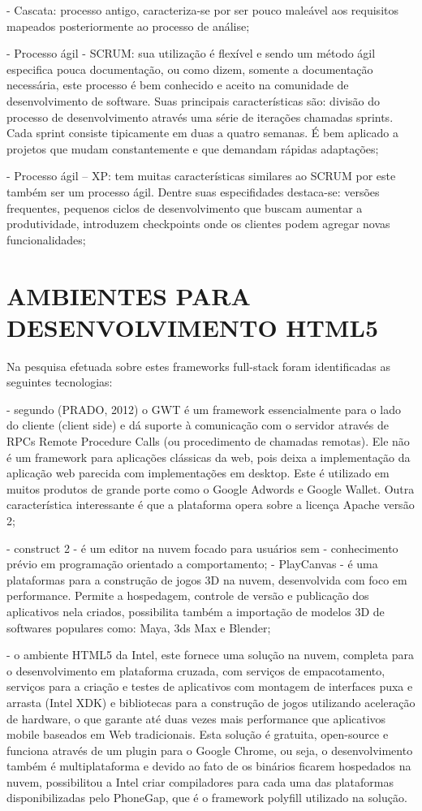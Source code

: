 \documentclass[
12pt,
a4paper,
portuges,
draft
]{report}
\begin{document}
- Cascata: processo antigo, caracteriza-se por ser pouco maleável aos
requisitos mapeados posteriormente ao processo de análise;

- Processo ágil - SCRUM: sua utilização é flexível e sendo
um método ágil especifica pouca documentação, ou como dizem,
somente a documentação necessária, este processo é bem conhecido e
aceito na comunidade de desenvolvimento de software. Suas principais
características são: divisão do processo de desenvolvimento através
uma série de iterações chamadas sprints. Cada sprint consiste
tipicamente em duas a quatro semanas. É bem aplicado a projetos que
mudam constantemente e que demandam rápidas adaptações;

- Processo ágil – XP: tem muitas características similares ao SCRUM
por este também ser um processo ágil. Dentre suas especifidades
destaca-se: versões frequentes, pequenos ciclos de desenvolvimento que
buscam aumentar a produtividade, introduzem checkpoints onde os clientes
podem agregar novas funcionalidades;

\chapter{AMBIENTES PARA DESENVOLVIMENTO HTML5}

Na pesquisa efetuada sobre estes frameworks full-stack foram
identificadas as seguintes tecnologias:

    - segundo (PRADO, 2012) o GWT é um framework essencialmente para
o lado do cliente (client side) e dá suporte à comunicação com
o servidor através de RPCs Remote Procedure Calls (ou procedimento
de chamadas remotas). Ele não é um framework para aplicações
clássicas da web, pois deixa a implementação da aplicação web
parecida com implementações em desktop. Este é utilizado em muitos
produtos de grande porte como o Google Adwords e Google Wallet. Outra
característica interessante é que a plataforma opera sobre a licença
Apache versão 2;

    - construct 2 - é um editor na nuvem focado para usuários sem
    - conhecimento prévio em programação orientado a comportamento;
    - PlayCanvas - é uma plataformas para a construção de jogos 3D
na nuvem, desenvolvida com foco em performance. Permite a hospedagem,
controle de versão e publicação dos aplicativos nela criados,
possibilita também a importação de modelos 3D de softwares populares
como: Maya, 3ds Max e Blender;

    - o ambiente HTML5 da Intel, este fornece uma solução na nuvem,
completa para o desenvolvimento em plataforma cruzada, com serviços de
empacotamento, serviços para a criação e testes de aplicativos com
montagem de interfaces puxa e arrasta (Intel XDK) e bibliotecas para a
construção de jogos utilizando aceleração de hardware, o que garante
até duas vezes mais performance que aplicativos mobile baseados em
Web tradicionais. Esta solução é gratuita, open-source e funciona
através de um plugin para o Google Chrome, ou seja, o desenvolvimento
também é multiplataforma e devido ao fato de os binários ficarem
hospedados na nuvem, possibilitou a Intel criar compiladores para cada
uma das plataformas disponibilizadas pelo PhoneGap, que é o framework
polyfill utilizado na solução.
\end{document}
